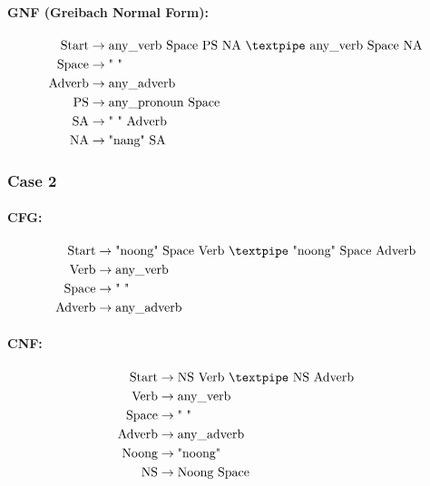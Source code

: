 \paragraph{GNF (Greibach Normal Form):}

\begin{equation*}
    \begin{aligned}
        \text{Start} &\rightarrow \text{any\_verb Space PS NA {\textpipe} any\_verb Space NA} \\
        \text{Space} &\rightarrow \text{" "} \\
        \text{Adverb} &\rightarrow \text{any\_adverb} \\
        \text{PS} &\rightarrow \text{any\_pronoun Space} \\
        \text{SA} &\rightarrow \text{" " Adverb} \\
        \text{NA} &\rightarrow \text{"nang" SA}
    \end{aligned}
\end{equation*}

\subsubsection{Case 2}

\paragraph{CFG:}

\begin{equation*}
    \begin{aligned}
        \text{Start} &\rightarrow \text{"noong" Space Verb {\textpipe} "noong" Space Adverb} \\
        \text{Verb} &\rightarrow \text{any\_verb} \\
        \text{Space} &\rightarrow \text{" "} \\
        \text{Adverb} &\rightarrow \text{any\_adverb}
    \end{aligned}
\end{equation*}

\paragraph{CNF:}

\begin{equation*}
    \begin{aligned}
        \text{Start} &\rightarrow \text{NS Verb {\textpipe} NS Adverb} \\
        \text{Verb} &\rightarrow \text{any\_verb} \\
        \text{Space} &\rightarrow \text{" "} \\
        \text{Adverb} &\rightarrow \text{any\_adverb} \\
        \text{Noong} &\rightarrow \text{"noong"} \\
        \text{NS} &\rightarrow \text{Noong Space}
    \end{aligned}
\end{equation*}

